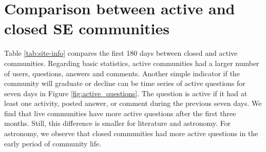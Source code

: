 

\section{Comparison between active and closed SE communities}

Table \ref{tab:site-info} compares the first 180 days between closed and active communities. Regarding basic statistics, active communities had a larger number of users, questions, answers and comments. Another simple indicator if the community will graduate or decline can be time series of active questions for seven days in Figure \ref{fig:active_questions}. The question is active if it had at least one activity, posted answer, or comment during the previous seven days. We find that live communities have more active questions after the first three months. Still, this difference is smaller for literature and astronomy. For astronomy, we observe that closed communities had more active questions in the early period of community life.


